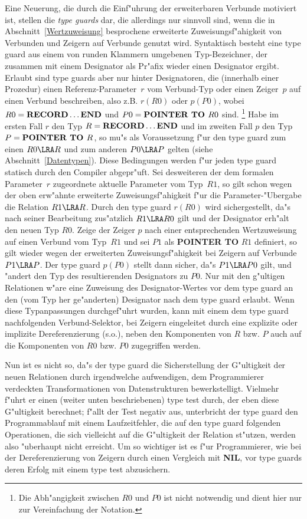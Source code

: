 Eine Neuerung, die durch die Einf"uhrung der erweiterbaren Verbunde
motiviert ist, stellen die {\it type guards\/} dar, die allerdings
nur sinnvoll sind, wenn die in Abschnitt~\ref{Wertzuweisung} besprochene
erweiterte Zuweisungsf"ahigkeit von Verbunden und Zeigern auf Verbunde
genutzt wird.
Syntaktisch besteht eine type guard aus einem von runden Klammern umgebenen
Typ-Bezeichner, der zusammen mit einem Designator als Pr"afix wieder
einen Designator ergibt.
Erlaubt sind type guards aber nur hinter Designatoren, die (innerhalb einer
Prozedur) einen Referenz-Parameter~$r$ vom Verbund-Typ oder einen Zeiger~$p$
auf einen Verbund beschreiben, also z.B. $r(R0)$ oder $p(P0)$, wobei
$R0 = \hbox{\bf RECORD} \ldots\hbox{\bf END}$ und
$P0 = \hbox{\bf POINTER TO } R0$ sind.%
\footnote{Die Abh"angigkeit zwischen $R0$ und $P0$ ist nicht notwendig und
dient hier nur zur Vereinfachung der Notation.}
Habe im ersten Fall $r$ den Typ $R = \hbox{\bf RECORD} \ldots\hbox{\bf END}$
und im zweiten Fall $p$ den Typ $P = \hbox{\bf POINTER TO } R$, so mu"s
als Voraussetzung f"ur den type guard zum einen
$R0 \LRA R$ und zum anderen $P0\LRA P$ gelten (siehe Abschnitt~\ref{Datentypen}).
Diese Bedingungen werden f"ur jeden type guard statisch durch den Compiler abgepr"uft.
Sei desweiteren der dem formalen Parameter~$r$ zugeordnete aktuelle Parameter
vom Typ~$R1$, so gilt schon wegen der oben erw"ahnte erweiterte Zuweisungsf"ahigkeit
f"ur die Parameter-"Ubergabe die Relation $R1\LRA R$.
Durch den type guard $r(R0)$ wird sichergestellt, da"s nach seiner Bearbeitung
zus"atzlich $R1\LRA R0$ gilt und der Designator erh"alt den neuen Typ $R0$.
Zeige der Zeiger $p$ nach einer entsprechenden Wertzuweisung auf einen Verbund
vom Typ~$R1$ und sei $P1$ als {\bf POINTER TO} $R1$ definiert, so gilt wieder
wegen der erweiterten Zuweisungsf"ahigkeit bei Zeigern auf Verbunde
$P1\LRA P$.
Der type guard $p(P0)$ stellt dann sicher, da"s $P1\LRA P0$ gilt, und "andert
den Typ des resultierenden Designators zu $P0$.
Nur mit den g"ultigen Relationen w"are eine Zuweisung des Designator-Wertes
vor dem type guard an den (vom Typ her ge"anderten) Designator nach dem type guard
erlaubt.
Wenn diese Typanpassungen durchgef"uhrt wurden, kann mit einem dem type guard
nachfolgenden Verbund-Selektor, bei Zeigern eingeleitet durch eine explizite
oder implizite Dereferenzierung (s.o.), neben den Komponenten von $R$ bzw.
$P$ auch auf die Komponenten von $R0$ bzw. $P0$ zugegriffen werden.

Nun ist es nicht so, da"s der type guard die Sicherstellung der G"ultigkeit
der neuen Relationen durch irgendwelche aufwendigen, dem Programmierer
verdeckten Transformationen von Datenstrukturen bewerkstelligt.
Vielmehr f"uhrt er einen (weiter unten beschriebenen) type test durch, der eben
diese G"ultigkeit berechnet; f"allt der Test negativ aus, unterbricht der
type guard den Programm\-ablauf mit einem Laufzeitfehler, die auf den type guard
folgenden Operationen, die sich vielleicht auf die G"ultigkeit der Relation
st"utzen, werden also "uberhaupt nicht erreicht.
Um so wichtiger ist es f"ur Programmierer, wie bei der Dereferenzierung von
Zeigern durch einen Vergleich mit {\bf NIL}, vor type guards deren Erfolg mit
einem type test abzusichern.

